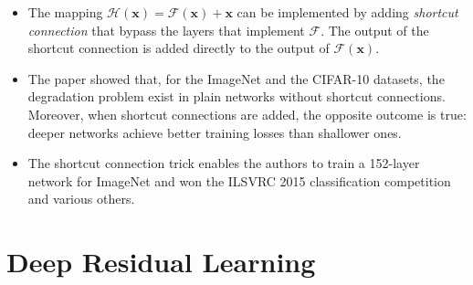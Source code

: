 \documentclass[10pt]{article}
\newcommand{\ve}[1]{\mathbf{#1}}
\begin{document}
\begin{itemize}
  	\item The mapping $\mathcal{H}(\ve{x}) = \mathcal{F}(\ve{x}) + \ve{x}$ can be implemented by adding \emph{shortcut connection} that bypass the layers that implement $\mathcal{F}$. The output of the shortcut connection is added directly to the output of $\mathcal{F}(\ve{x})$.

  	\item The paper showed that, for the ImageNet and the CIFAR-10 datasets, the degradation problem exist in plain networks without shortcut connections. Moreover, when shortcut connections are added, the opposite outcome is true: deeper networks achieve better training losses than shallower ones.

  	\item The shortcut connection trick enables the authors to train a 152-layer network for ImageNet and won the ILSVRC 2015 classification competition and various others.  
  \end{itemize}

  \section{Deep Residual Learning}  
\end{document}
